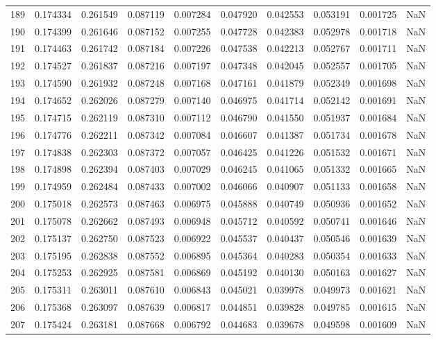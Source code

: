 \begin{tabular}{lrrrrrrrrr}
189 & 0.174334 & 0.261549 & 0.087119 & 0.007284 & 0.047920 & 0.042553 & 0.053191 & 0.001725 & NaN \\
190 & 0.174399 & 0.261646 & 0.087152 & 0.007255 & 0.047728 & 0.042383 & 0.052978 & 0.001718 & NaN \\
191 & 0.174463 & 0.261742 & 0.087184 & 0.007226 & 0.047538 & 0.042213 & 0.052767 & 0.001711 & NaN \\
192 & 0.174527 & 0.261837 & 0.087216 & 0.007197 & 0.047348 & 0.042045 & 0.052557 & 0.001705 & NaN \\
193 & 0.174590 & 0.261932 & 0.087248 & 0.007168 & 0.047161 & 0.041879 & 0.052349 & 0.001698 & NaN \\
194 & 0.174652 & 0.262026 & 0.087279 & 0.007140 & 0.046975 & 0.041714 & 0.052142 & 0.001691 & NaN \\
195 & 0.174715 & 0.262119 & 0.087310 & 0.007112 & 0.046790 & 0.041550 & 0.051937 & 0.001684 & NaN \\
196 & 0.174776 & 0.262211 & 0.087342 & 0.007084 & 0.046607 & 0.041387 & 0.051734 & 0.001678 & NaN \\
197 & 0.174838 & 0.262303 & 0.087372 & 0.007057 & 0.046425 & 0.041226 & 0.051532 & 0.001671 & NaN \\
198 & 0.174898 & 0.262394 & 0.087403 & 0.007029 & 0.046245 & 0.041065 & 0.051332 & 0.001665 & NaN \\
199 & 0.174959 & 0.262484 & 0.087433 & 0.007002 & 0.046066 & 0.040907 & 0.051133 & 0.001658 & NaN \\
200 & 0.175018 & 0.262573 & 0.087463 & 0.006975 & 0.045888 & 0.040749 & 0.050936 & 0.001652 & NaN \\
201 & 0.175078 & 0.262662 & 0.087493 & 0.006948 & 0.045712 & 0.040592 & 0.050741 & 0.001646 & NaN \\
202 & 0.175137 & 0.262750 & 0.087523 & 0.006922 & 0.045537 & 0.040437 & 0.050546 & 0.001639 & NaN \\
203 & 0.175195 & 0.262838 & 0.087552 & 0.006895 & 0.045364 & 0.040283 & 0.050354 & 0.001633 & NaN \\
204 & 0.175253 & 0.262925 & 0.087581 & 0.006869 & 0.045192 & 0.040130 & 0.050163 & 0.001627 & NaN \\
205 & 0.175311 & 0.263011 & 0.087610 & 0.006843 & 0.045021 & 0.039978 & 0.049973 & 0.001621 & NaN \\
206 & 0.175368 & 0.263097 & 0.087639 & 0.006817 & 0.044851 & 0.039828 & 0.049785 & 0.001615 & NaN \\
207 & 0.175424 & 0.263181 & 0.087668 & 0.006792 & 0.044683 & 0.039678 & 0.049598 & 0.001609 & NaN \\

\end{tabular}
